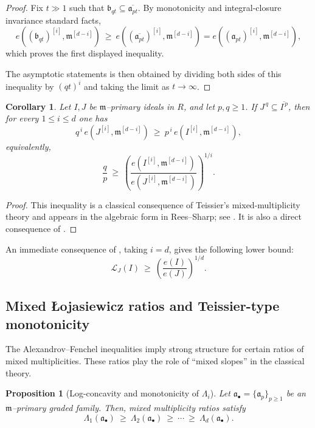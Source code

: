 \documentclass[12pt]{amsart}
\newcommand{\m}{\mathfrak m}
\renewcommand{\a}{\mathfrak{a}}
\renewcommand{\b}{\mathfrak{b}}
\newcommand{\Loj}{\mathcal{L}} %
\newcommand{\abul}{{\a_\bullet}}
\theoremstyle{plain}
\newtheorem{proposition}[theorem]{Proposition}
\newtheorem{corollary}[theorem]{Corollary}
\theoremstyle{definition}
\numberwithin{equation}{section}
\begin{document}
\begin{proof}
Fix $t\gg 1$ such that $\b_{qt}\subseteq \overline{\a_{pt}}$.
By monotonicity and integral-closure invariance standard facts,
\[
e((\b_{qt})^{[i]},\m^{[d-i]})
\ \ge\
e((\overline{\a_{pt}})^{[i]},\m^{[d-i]})
=
e((\a_{pt})^{[i]},\m^{[d-i]}),
\]
which proves the first displayed inequality.

The asymptotic statements is then obtained by dividing both sides of this inequality by $(qt)^i$ and taking the limit as $t\to\infty$.
\end{proof}

\begin{corollary}\label{cor:containment-mixed-ideal}
Let $I,J$ be $\m$--primary ideals in $R$, and let $p,q\ge 1$.
If $J^{\,q}\subseteq \overline{I^{\,p}}$, then for every $1\le i\le d$ one has
\[
q^{\,i}\,e(J^{[i]},\m^{[d-i]})
\ \ge\
p^{\,i}\,e(I^{[i]},\m^{[d-i]}),
\]
equivalently,
\[
\frac{q}{p}\ \ge\ \left(\frac{e(I^{[i]},\m^{[d-i]})}{e(J^{[i]},\m^{[d-i]})}\right)^{1/i}.
\]
\end{corollary}

\begin{proof}
This inequality is a classical consequence of Teissier’s mixed-multiplicity theory and appears in the algebraic form in Rees--Sharp; see \cite{Teissier77,ReesSharp78}. It is also a direct consequence of .
\end{proof}

An immediate consequence of , taking $i=d$, gives the following lower bound:
\[
\Loj_{J}(I)\ \ge\ \left(\frac{e(I)}{e(J)}\right)^{1/d}.
\]

\subsection{Mixed \L ojasiewicz ratios and Teissier-type monotonicity}

The Alexandrov--Fenchel inequalities imply strong structure for certain ratios of mixed
multiplicities. These ratios play the role of ``mixed slopes'' in the classical theory.

\begin{proposition}[Log-concavity and monotonicity of $\Lambda_i$]\label{prop:Lambda-monotone}
Let $\abul=\{\a_p\}_{p\ge 1}$ be an $\m$--primary graded family.
Then, mixed multiplicity ratios satisfy
\[
\Lambda_1(\abul)\ \ge\ \Lambda_2(\abul)\ \ge\ \cdots\ \ge\ \Lambda_d(\abul).
\]
\end{proposition}
\end{document}
